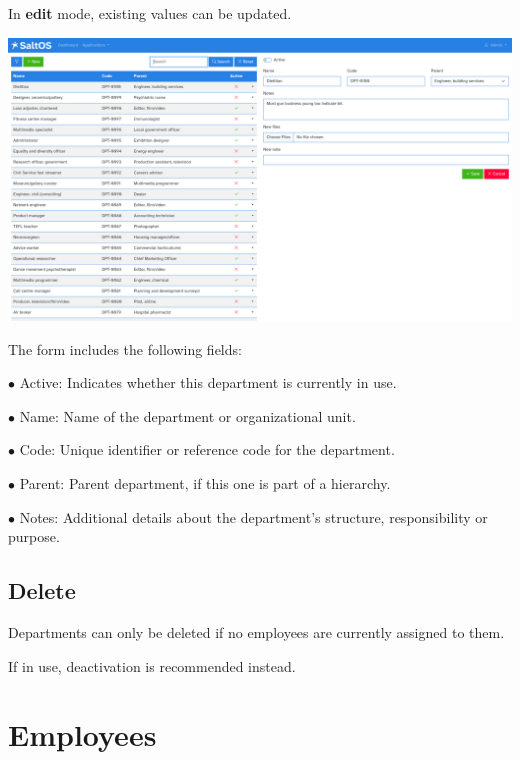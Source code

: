 \documentclass[a4paper]{article}
\begin{document}
In \textbf{edit} mode, existing values can be updated.

\begin{center}\includegraphics[width=1\textwidth]{../ujest/snaps/test-screenshots-js-screenshots-hr-departments-edit-100-en-us-1-snap.png}\end{center}

The form includes the following fields:

\begin{compactitem}
\item[\color{myblue}$\bullet$] Active: Indicates whether this department is currently in use.
\item[\color{myblue}$\bullet$] Name: Name of the department or organizational unit.
\item[\color{myblue}$\bullet$] Code: Unique identifier or reference code for the department.
\item[\color{myblue}$\bullet$] Parent: Parent department, if this one is part of a hierarchy.
\item[\color{myblue}$\bullet$] Notes: Additional details about the department's structure, responsibility or purpose.
\end{compactitem}

\hypertarget{toc105}{}
\subsection{Delete}

Departments can only be deleted if no employees are currently assigned to them.

If in use, deactivation is recommended instead.


\hypertarget{toc106}{}
\section{Employees}
\end{document}
